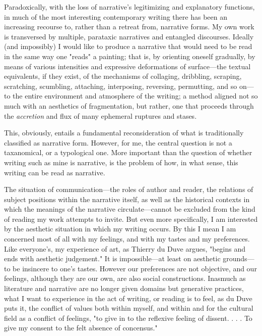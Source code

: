 Paradoxically, with the loss of narrative's legitimizing and explanatory
functions, in much of the most interesting contemporary writing there
has been an increasing recourse to, rather than a retreat from,
narrative forms. My own work is transversed by multiple, parataxic
narratives and entangled discourses. Ideally (and impossibly) I would
like to produce a narrative that would need to be read in the same way
one "reads" a painting; that is, by orienting oneself gradually, by
means of various intensities and expressive deformations of
surface---the textual equivalents, if they exist, of the mechanisms of
collaging, dribbling, scraping, scratching, scumbling, attaching,
interposing, reversing, permutting, and so on---to the entire
environment and atmosphere of the writing; a method aligned not so much
with an aesthetics of fragmentation, but rather, one that proceeds
through the \emph{accretion} and flux of many ephemeral ruptures and
stases.

This, obviously, entails a fundamental reconsideration of what is
traditionally classified as narrative form. However, for me, the central
question is not a taxanomical, or a typological one. More important than
the question of whether writing such as mine is narrative, is the
problem of how, in what sense, this writing can be read as narrative.

The situation of communication---the roles of author and reader, the
relations of subject positions within the narrative itself, as well as
the historical contexts in which the meanings of the narrative
circulate---cannot be excluded from the kind of reading my work attempts
to invite. But even more specifically, I am interested by the aesthetic
situation in which my writing occurs. By this I mean I am concerned most
of all with my feelings, and with my tastes and my preferences. Like
everyone's, my experience of art, as Thierry du Duve argues, "begins and
ends with aesthetic judgement." It is impossible---at least on aesthetic
grounds---to be insincere to one's tastes. However our preferences are
not objective, and our feelings, although they are our own, are also
social constructions. Inasmuch as literature and narrative are no longer
given domains but generative practices, what I want to experience in the
act of writing, or reading is to feel, as du Duve puts it, the conflict
of values both within myself, and within and for the cultural field as a
conflict of feelings, "to give in to the reflexive feeling of dissent. .
. . To give my consent to the felt absence of concensus."

